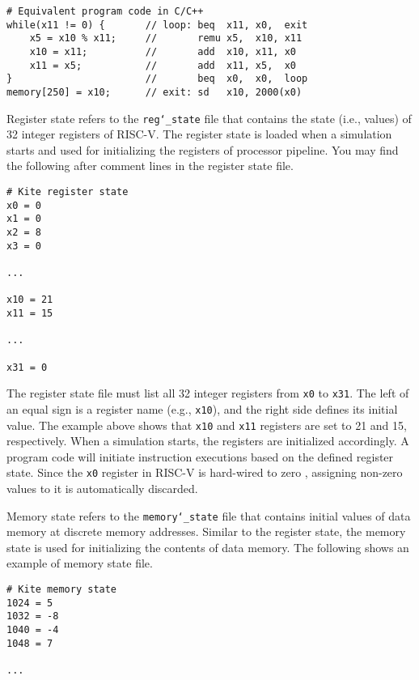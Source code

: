 \documentclass[10pt]{article}
\begin{document}
\begin{Verbatim}[frame=single,fontsize=\small]
# Equivalent program code in C/C++
while(x11 != 0) {       // loop: beq  x11, x0,  exit
    x5 = x10 % x11;     //       remu x5,  x10, x11
    x10 = x11;          //       add  x10, x11, x0
    x11 = x5;           //       add  x11, x5,  x0
}                       //       beq  x0,  x0,  loop
memory[250] = x10;      // exit: sd   x10, 2000(x0)
\end{Verbatim}

Register state refers to the {\tt reg\char`_state} file that contains the state (i.e., values) of 32 integer registers of RISC-V.
The register state is loaded when a simulation starts and used for initializing the registers of processor pipeline.
You may find the following after comment lines in the register state file.

\begin{Verbatim}[frame=single,fontsize=\small]
# Kite register state
x0 = 0
x1 = 0
x2 = 8
x3 = 0

...

x10 = 21
x11 = 15

...

x31 = 0
\end{Verbatim}

The register state file must list all 32 integer registers from {\tt x0} to {\tt x31}.
The left of an equal sign is a register name (e.g., {\tt x10}), and the right side defines its initial value.
The example above shows that {\tt x10} and {\tt x11} registers are set to 21 and 15, respectively.
When a simulation starts, the registers are initialized accordingly.
A program code will initiate instruction executions based on the defined register state.
Since the {\tt x0} register in RISC-V is hard-wired to zero \cite{patterson_morgan2017}, assigning non-zero values to it is automatically discarded.

Memory state refers to the {\tt memory\char`_state} file that contains initial values of data memory at discrete memory addresses.
Similar to the register state, the memory state is used for initializing the contents of data memory.
The following shows an example of memory state file.

\begin{Verbatim}[frame=single,fontsize=\small]
# Kite memory state
1024 = 5
1032 = -8
1040 = -4
1048 = 7

...

\end{Verbatim}
\end{document}
